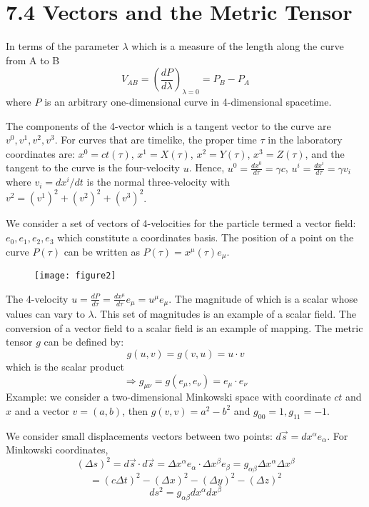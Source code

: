 \documentclass{article}
\begin{document}
    \section*{7.4 Vectors and the Metric Tensor}
    In terms of the parameter $\lambda$ which is a measure of the length along the curve from A to B
    $$ V_{AB} = \left(\frac{dP}{d\lambda}\right)_{\lambda=0} = P_B - P_A $$
    where $P$ is an arbitrary one-dimensional curve in 4-dimensional spacetime.
    
    The components of the 4-vector which is a tangent vector to the curve are $v^0, v^1, v^2, v^3$. For curves that are timelike, the proper time $\tau$ in the laboratory coordinates are: $x^0 = ct(\tau)$, $x^1 = X(\tau)$, $x^2 = Y(\tau)$, $x^3 = Z(\tau)$, and the tangent to the curve is the four-velocity $u$.
    Hence, $u^0 = \frac{dx^0}{d\tau} = \gamma c$, $u^i = \frac{dx^i}{d\tau} = \gamma v_i$ where $v_i = dx^i/dt$ is the normal three-velocity with $v^2 = (v^1)^2 + (v^2)^2 + (v^3)^2$.
    
    We consider a set of vectors of 4-velocities for the particle termed a vector field: $e_0, e_1, e_2, e_3$ which constitute a coordinates basis.
    The position of a point on the curve $P(\tau)$ can be written as $P(\tau) = x^\mu(\tau) e_\mu$.
    
    \begin{figure}[h]
    	\centering
    	\texttt{[image: figure2]}
    	\caption{}
    	\label{fig:figure2}
    \end{figure}
    
    The 4-velocity $u = \frac{dP}{d\tau} = \frac{dx^\mu}{d\tau} e_\mu = u^\mu e_\mu$.
    The magnitude of which is a scalar whose values can vary to $\lambda$. This set of magnitudes is an example of a scalar field.
    The conversion of a vector field to a scalar field is an example of mapping.
    The metric tensor $g$ can be defined by:
    $$ g(u, v) = g(v, u) = u \cdot v $$
    which is the scalar product
    $$ \Rightarrow g_{\mu\nu} = g(e_\mu, e_\nu) = e_\mu \cdot e_\nu $$
    Example: we consider a two-dimensional Minkowski space with coordinate $ct$ and $x$ and a vector $v=(a,b)$, then $g(v,v) = a^2 - b^2$ and $g_{00}=1, g_{11}=-1$.
    
    We consider small displacements vectors between two points: $d\vec{s} = dx^\alpha e_\alpha$.
    For Minkowski coordinates,
    $$ (\Delta s)^2 = d\vec{s} \cdot d\vec{s} = \Delta x^\alpha e_\alpha \cdot \Delta x^\beta e_\beta = g_{\alpha\beta} \Delta x^\alpha \Delta x^\beta $$
    $$ = (c\Delta t)^2 - (\Delta x)^2 - (\Delta y)^2 - (\Delta z)^2 $$
    $$ ds^2 = g_{\alpha\beta} dx^\alpha dx^\beta $$
    
\end{document}
